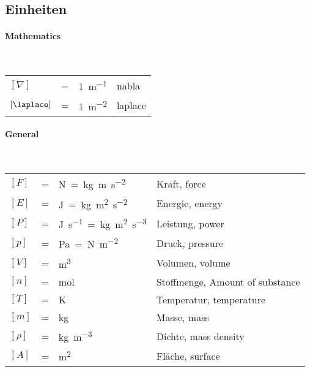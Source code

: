 	\subsection{Einheiten}
{
\renewcommand{\arraystretch}{1.1}	
	\begin{multicols}{2}
		\paragraph{Mathematics} ~\\

		\begin{tabularx}{\linewidth}{lclX}
			$[\nabla]$ &=& \si{1\per\meter} & nabla\\
			$[\laplace]$ &=& \si{1\per\meter\tothe{2}} & laplace\\
		\end{tabularx}

		\paragraph{General}~\\
		\begin{tabularx}{\linewidth}{lclX}
			$[F]$ &=& \si{\newton=\kilogram\meter\per\second\tothe{2}}& Kraft, force \\
			$[E]$ &=& \si{\joule=\kilogram\meter\tothe{2}\per\second\tothe{2}}& Energie, energy \\
			$[P]$ &=& \si{\joule\per\second=\kilogram\meter\tothe{2}\per\second\tothe{3}}& Leistung, power \\
			$[p]$ &=& \si{\pascal= \newton\per\meter\tothe{2}}& Druck, pressure \\
			$[V]$ &=& \si{\meter\tothe{3}}& Volumen, volume\\
			$[n]$ &=& \si{\mole}& Stoffmenge, Amount of substance\\
			$[T]$ &=& \si{\kelvin}& Temperatur, temperature \\
			$[m]$ &=& \si{\kilogram} & Masse, mass \\
			$[\rho]$ &=& \si{\kilogram\per\meter\tothe{3}} & Dichte, mass density \\
			$[A]$ &=& \si{\meter\tothe{2}} & Fläche, surface\\
		\end{tabularx}

\end{multicols}}
